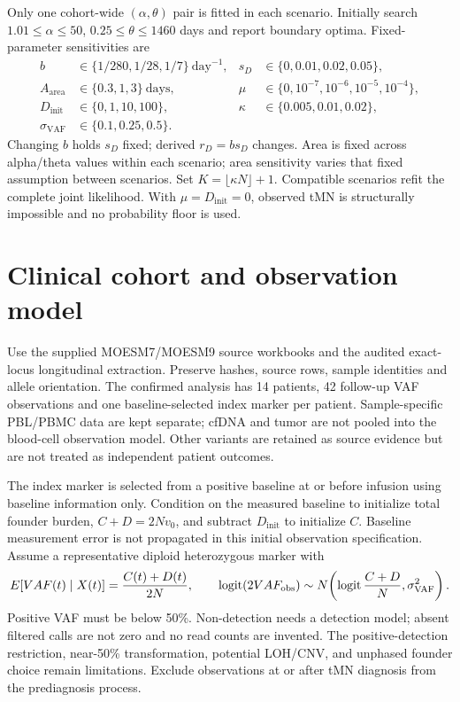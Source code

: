 \documentclass[11pt]{article}
\begin{document}
Only one cohort-wide $(\alpha,\theta)$ pair is fitted in each scenario. Initially search $1.01\le\alpha\le50$, $0.25\le\theta\le1460$ days and report boundary optima. Fixed-parameter sensitivities are
\begin{align*}
b&\in\{1/280,1/28,1/7\}\ \mathrm{day}^{-1}, &s_D&\in\{0,0.01,0.02,0.05\},\\
A_{\mathrm{area}}&\in\{0.3,1,3\}\ \mathrm{days}, &\mu&\in\{0,10^{-7},10^{-6},10^{-5},10^{-4}\},\\
D_{\mathrm{init}}&\in\{0,1,10,100\}, &\kappa&\in\{0.005,0.01,0.02\},\\
\sigma_{\mathrm{VAF}}&\in\{0.1,0.25,0.5\}.&&
\end{align*}
Changing $b$ holds $s_D$ fixed; derived $r_D=bs_D$ changes. Area is fixed across alpha/theta values within each scenario; area sensitivity varies that fixed assumption between scenarios. Set $K=\lfloor\kappa N\rfloor+1$. Compatible scenarios refit the complete joint likelihood. With $\mu=D_{\mathrm{init}}=0$, observed tMN is structurally impossible and no probability floor is used.

\section{Clinical cohort and observation model}
Use the supplied MOESM7/MOESM9 source workbooks and the audited exact-locus longitudinal extraction. Preserve hashes, source rows, sample identities and allele orientation. The confirmed analysis has 14 patients, 42 follow-up VAF observations and one baseline-selected index marker per patient. Sample-specific PBL/PBMC data are kept separate; cfDNA and tumor are not pooled into the blood-cell observation model. Other variants are retained as source evidence but are not treated as independent patient outcomes.

The index marker is selected from a positive baseline at or before infusion using baseline information only. Condition on the measured baseline to initialize total founder burden, $C+D=2Nv_0$, and subtract $D_{\mathrm{init}}$ to initialize $C$. Baseline measurement error is not propagated in this initial observation specification. Assume a representative diploid heterozygous marker with
\[
E[VAF(t)\mid X(t)]=\frac{C(t)+D(t)}{2N},\qquad
\operatorname{logit}(2VAF_{\rm obs})\sim N\!\left(\operatorname{logit}\frac{C+D}{N},\sigma_{\mathrm{VAF}}^2\right).
\]
Positive VAF must be below 50\%. Non-detection needs a detection model; absent filtered calls are not zero and no read counts are invented. The positive-detection restriction, near-50\% transformation, potential LOH/CNV, and unphased founder choice remain limitations. Exclude observations at or after tMN diagnosis from the prediagnosis process.
\end{document}
